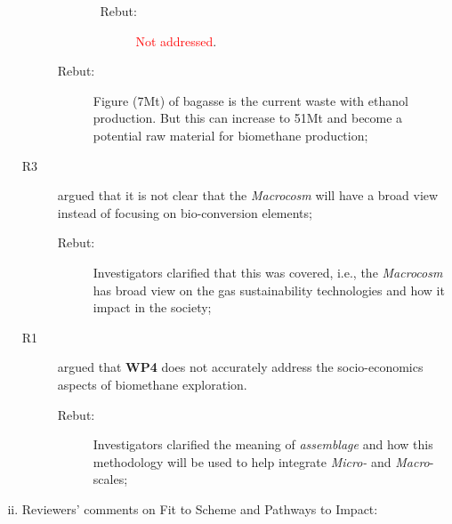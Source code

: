\documentclass[14pt,twoside]{report}
\begin{document}
\begin{enumerate}[(i)]
\begin{description}
\begin{enumerate}
\begin{itemize}
                          \begin{description}
                            \item[Rebut:] \textcolor{red}{Not addressed}.
                          \end{description}
                   \end{itemize}
            \end{enumerate}
            \begin{description}
               \item[Rebut:] Figure (7Mt) of bagasse is the current waste with ethanol production. But this can increase to 51Mt and become a potential raw material for biomethane production; 
            \end{description}
          \item[R3] argued that it is not clear that the {\it Macrocosm} will have a broad view instead of focusing on bio-conversion elements;
            \begin{description}
               \item[Rebut:] Investigators clarified that this was covered, i.e., the {\it Macrocosm} has broad view on the gas sustainability technologies and how it impact in the society;
            \end{description}
          \item[R1] argued that {\bf WP4} does not accurately address the socio-economics aspects of biomethane exploration.
            \begin{description}
               \item[Rebut:] Investigators clarified the meaning of {\it assemblage} and how this methodology will be used to help integrate {\it Micro-} and {\it Macro}-scales;
            \end{description}
%          
       \end{description}
%
     \item Reviewers' comments on Fit to Scheme and Pathways to Impact:
%


\end{enumerate}
\end{document}
